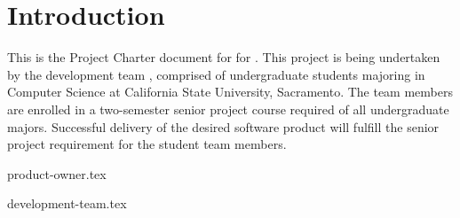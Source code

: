 \section{Introduction}
This is the Project Charter document for {\ProjectName} for {\ClientName}. This
project is being undertaken by the development team {\TeamName}, comprised of
undergraduate students majoring in Computer Science at California State
University, Sacramento. The team members are enrolled in a two-semester senior
project course required of all undergraduate majors. Successful delivery of the
desired software product will fulfill the senior project requirement for the
student team members.

{product-owner.tex}

{development-team.tex}